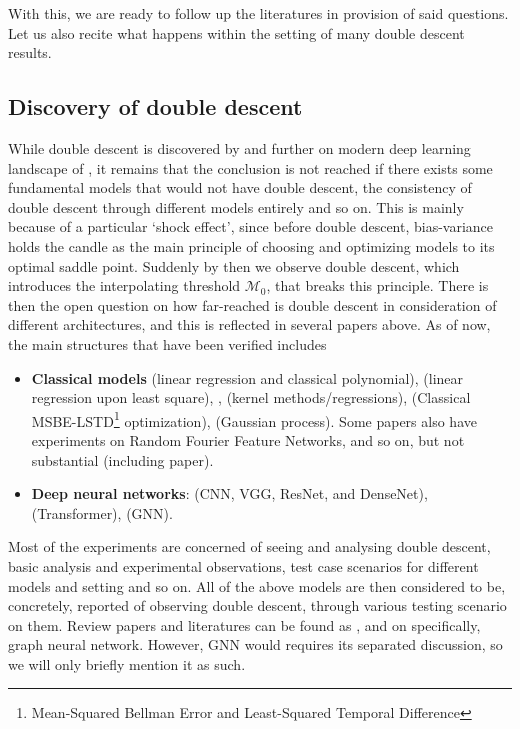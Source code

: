 \documentclass[
  journal=largetwo,
  year=2025,
  volume=37,
]{cup-journal}
\begin{document}
With this, we are ready to follow up the literatures in provision of said questions. Let us also recite what happens within the setting of many double descent results. 

\subsection{Discovery of double descent}
While double descent is discovered by \cite{belkin_reconciling_2019} and further on modern deep learning landscape of \cite{nakkiran_deep_2019}, it remains that the conclusion is not reached if there exists some fundamental models that would not have double descent, the consistency of double descent through different models entirely and so on. This is mainly because of a particular `shock effect', since before double descent, bias-variance holds the candle as the main principle of choosing and optimizing models to its optimal saddle point. Suddenly by then we observe double descent, which introduces the interpolating threshold $\mathcal{M}_{0}$, that breaks this principle. There is then the open question on how far-reached is double descent in consideration of different architectures, and this is reflected in several papers above. As of now, the main structures that have been verified includes
\begin{itemize}[topsep=1pt, itemsep=1pt]
    \item \textbf{Classical models} \cite{Yang_2024,nakkiran2019moredata,schaeffer_double_2023,lafon_understanding_2024} (linear regression and classical polynomial), \cite{NEURIPS2024_2d43f7a6} (linear regression upon least square), \cite{liu2021kernelregressionhighdimensions}, \cite{zhang2024manipulatingsparsedoubledescent,allerbo2025changingkerneltrainingleads} (kernel methods/regressions), \cite{brellmann2024on} (Classical MSBE-LSTD\footnote{Mean-Squared Bellman Error and Least-Squared Temporal Difference} optimization), \cite{harzli2023doubledescentcurvesneuralnetworks} (Gaussian process). Some papers also have experiments on Random Fourier Feature Networks, and so on, but not substantial (including \cite{belkin_reconciling_2019} paper). 
    \item \textbf{Deep neural networks}: \cite{luo2023doubledescentdiscrepancytask,Yang_2024,pezeshki2021multiscalefeaturelearningdynamics} (CNN, VGG, ResNet, and DenseNet), \cite{nakkiran_deep_2019} (Transformer), \cite{shi2024homophilymodulatesdoubledescent} (GNN). 
\end{itemize}

Most of the experiments are concerned of seeing and analysing double descent, basic analysis and experimental observations, test case scenarios for different models and setting and so on. All of the above models are then considered to be, concretely, reported of observing double descent, through various testing scenario on them. Review papers and literatures can be found as \cite{schaeffer_double_2023,ErdongHu2021}, and \cite{shi2024homophilymodulatesdoubledescent} on specifically, graph neural network. However, GNN would requires its separated discussion, so we will only briefly mention it as such. 
\end{document}
